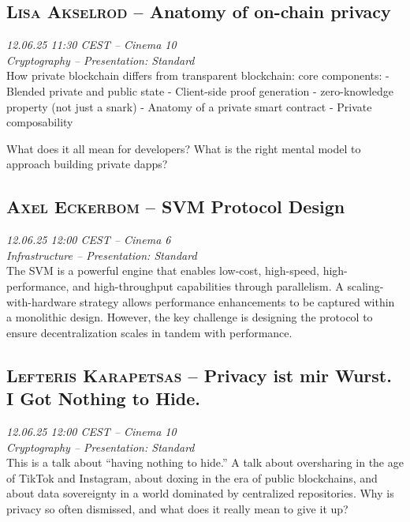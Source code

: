 \clearpage
\subsection {\textsc{Lisa Akselrod}  -- Anatomy of on-chain privacy} \noindent \textit {12.06.25 11:30 CEST -- Cinema 10\\ Cryptography -- Presentation: Standard}\\[1em] How private blockchain differs from transparent blockchain: core components:
- Blended private and public state
- Client-side proof generation
- zero-knowledge property (not just a snark)
- Anatomy of a private smart contract
- Private composability

What does it all mean for developers? What is the right mental model to approach building private dapps?

\clearpage
\subsection {\textsc{Axel Eckerbom}  -- SVM Protocol Design} \noindent \textit {12.06.25 12:00 CEST -- Cinema 6\\ Infrastructure -- Presentation: Standard}\\[1em] The SVM is a powerful engine that enables low-cost, high-speed, high-performance, and high-throughput capabilities through parallelism. A scaling-with-hardware strategy allows performance enhancements to be captured within a monolithic design. However, the key challenge is designing the protocol to ensure decentralization scales in tandem with performance.

\clearpage
\subsection {\textsc{Lefteris Karapetsas}  -- Privacy ist mir Wurst. I Got Nothing to Hide.} \noindent \textit {12.06.25 12:00 CEST -- Cinema 10\\ Cryptography -- Presentation: Standard}\\[1em] This is a talk about ``having nothing to hide.'' A talk about oversharing in the age of TikTok and Instagram, about doxing in the era of public blockchains, and about data sovereignty in a world dominated by centralized repositories. Why is privacy so often dismissed, and what does it really mean to give it up?

\clearpage
